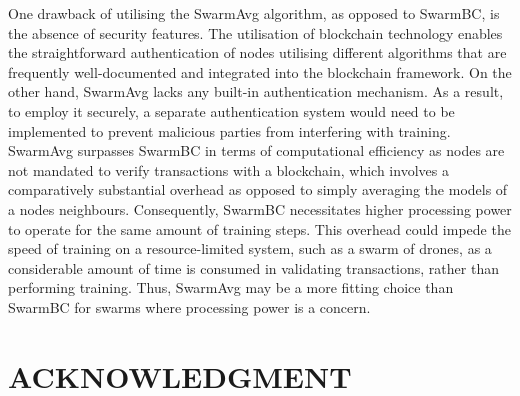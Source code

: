 \documentclass[letterpaper, 10 pt, conference]{ieeeconf}  %
\begin{document}
One drawback of utilising the SwarmAvg algorithm, as opposed to SwarmBC, is the absence of security features. The utilisation of blockchain technology enables the straightforward authentication of nodes utilising different algorithms that are frequently well-documented and integrated into the blockchain framework. On the other hand, SwarmAvg lacks any built-in authentication mechanism. As a result, to employ it securely, a separate authentication system would need to be implemented to prevent malicious parties from interfering with training. \\

SwarmAvg surpasses SwarmBC in terms of computational efficiency as nodes are not mandated to verify transactions with a blockchain, which involves a comparatively substantial overhead as opposed to simply averaging the models of a nodes neighbours. Consequently, SwarmBC necessitates higher processing power to operate for the same amount of training steps. This overhead could impede the speed of training on a resource-limited system, such as a swarm of drones, as a considerable amount of time is consumed in validating transactions, rather than performing training. Thus, SwarmAvg may be a more fitting choice than SwarmBC for swarms where processing power is a concern.


\addtolength{\textheight}{-12cm}   %








\section*{ACKNOWLEDGMENT}
\end{document}

